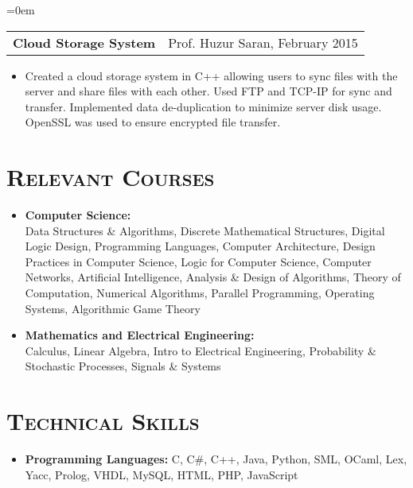 \documentclass{article}
\makeatletter
\newenvironment{longversion}{}{} %
\newcommand{\headerrow}[2]
{\begin{tabular*}{\linewidth}{l@{\extracolsep{\fill}}r}
	#1 &
	#2 \\
\end{tabular*}}
\newcommand{\tmpsection}[1]{}
\let\tmpsection=\section
\renewcommand{\section}[1]{\tmpsection*{\textsc{#1}}}
\makeatother
\begin{document}
\begin{longversion}
\begin{list} {}{\leftmargin=0em}
\item[]
  \headerrow{ \textbf{Cloud Storage System}} {Prof. Huzur Saran, February 2015}
  \begin{itemize} \item[]
  Created a cloud storage system in C++ allowing users to sync files with the server and share files with each other. Used FTP and TCP-IP for sync and transfer. Implemented data de-duplication to minimize server disk usage. OpenSSL was used to ensure encrypted file transfer.
  \end{itemize}

\end{list}
\end{longversion}

\begin{longversion}
\section{Relevant Courses}
\begin{itemize}
  \setlength\itemsep{-1em}
    \item \textbf{Computer Science:} \\
      Data Structures \& Algorithms, Discrete Mathematical Structures, Digital Logic Design, Programming Languages, Computer Architecture, Design Practices in Computer Science, Logic for Computer Science, Computer Networks, Artificial Intelligence, Analysis \& Design of Algorithms, Theory of Computation, Numerical Algorithms, Parallel Programming, Operating Systems, Algorithmic Game Theory  \\

    \item \textbf{Mathematics and Electrical Engineering:} \\
      Calculus, Linear Algebra, Intro to Electrical Engineering, Probability \& Stochastic Processes, Signals \& Systems
\end{itemize}
\end{longversion}

\begin{longversion}
\section{Technical Skills}
\begin{itemize}
    \item \textbf{Programming Languages:} C, C\#, C++, Java, Python, SML, OCaml, Lex, Yacc, Prolog, VHDL, MySQL, HTML, PHP, JavaScript 
\end{itemize}
\end{longversion}
\end{document}
